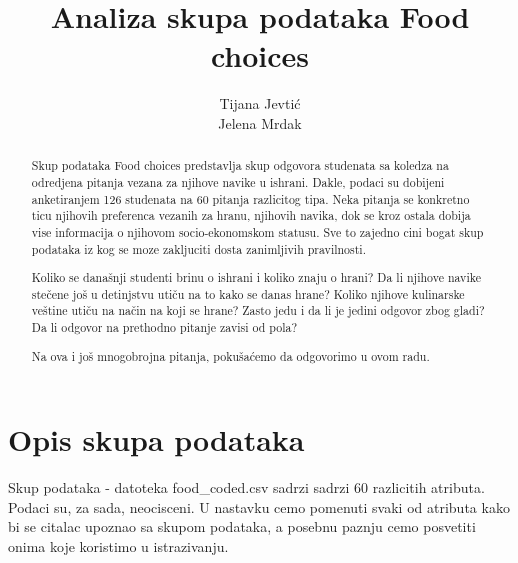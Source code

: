 \documentclass[12pt,a4paper]{article}
\title{Analiza skupa podataka Food choices}
\author{Tijana Jevti\' c \\ Jelena Mrdak}
\begin{document}
\maketitle
\begin{abstract}
Skup podataka Food choices predstavlja skup odgovora studenata sa koledza na odredjena pitanja vezana za njihove navike u ishrani. Dakle, podaci su dobijeni anketiranjem 126 studenata na 60 pitanja razlicitog tipa. Neka pitanja se konkretno ticu njihovih preferenca vezanih za hranu, njihovih navika, dok se kroz ostala dobija vise informacija o njihovom socio-ekonomskom statusu. Sve to zajedno cini bogat skup podataka iz kog se moze zakljuciti dosta zanimljivih pravilnosti.

Koliko se dana\v snji studenti brinu o ishrani i koliko znaju o hrani? Da li njihove navike ste\v cene jo\v s u detinjstvu uti\v cu na to kako se danas hrane? Koliko njihove kulinarske ve\v stine uti\v cu na na\v cin na koji se hrane? Zasto jedu i da li je jedini odgovor zbog gladi? Da li odgovor na prethodno pitanje zavisi od pola?

Na ova i jo\v s mnogobrojna pitanja, poku\v sa\' cemo da odgovorimo u ovom radu.
\end{abstract}

\tableofcontents

\section{Opis skupa podataka}
Skup podataka - datoteka food\_coded.csv sadrzi sadrzi 60 razlicitih atributa. Podaci su, za sada, neocisceni. U nastavku cemo pomenuti svaki od atributa kako bi se citalac upoznao sa skupom podataka, a posebnu paznju cemo posvetiti onima koje koristimo u istrazivanju.
\end{document}
